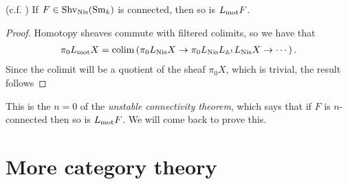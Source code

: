 \documentclass[11pt]{amsart}
\begin{document}
\begin{corollary} (c.f. \cite[1.2]{bachmannstrongly}) If $F\in \mathrm{Shv}_{\mathrm{Nis}}(\mathrm{Sm}_k)$ is connected, then so is $L_{\mathrm{mot}} F$.
\end{corollary}
\begin{proof} Homotopy sheaves commute with filtered colimits, so we have that
\begin{align*}
    \pi_0 L_{\mathrm{mot}} X = \mathrm{colim} \left( \pi_0 L_{\mathrm{Nis}} X \to \pi_0 L_{\mathrm{Nis}} L_{\mathbb{A}^1} L_{\mathrm{Nis}} X \to \cdots  \right).
\end{align*}
Since the colimit will be a quotient of the sheaf $\pi_0 X$, which is trivial, the result follows
\end{proof}


This is the $n=0$ of the \textit{unstable connectivity theorem}, which says that if $F$ is $n$-connected then so is $L_{\mathrm{mot}} F$. We will come back to prove this.


\newpage
\appendix
\section{More category theory}



\printbibliography
\end{document}
